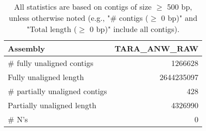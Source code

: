 \documentclass[12pt,a4paper]{article}
\begin{document}
\begin{table}[ht]
\begin{center}
\caption{All statistics are based on contigs of size $\geq$ 500 bp, unless otherwise noted (e.g., "\# contigs ($\geq$ 0 bp)" and "Total length ($\geq$ 0 bp)" include all contigs).}
\begin{tabular}{|l*{1}{|r}|}
\hline
Assembly & TARA\_ANW\_RAW \\ \hline
\# fully unaligned contigs & 1266628 \\ \hline
Fully unaligned length & 2644235097 \\ \hline
\# partially unaligned contigs & 428 \\ \hline
Partially unaligned length & 4326990 \\ \hline
\# N's & 0 \\ \hline
\end{tabular}
\end{center}
\end{table}
\end{document}
